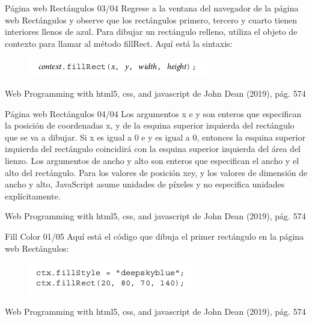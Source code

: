 \begin{frame}{Página web Rectángulos 03/04}
\justifying
Regrese a la ventana del navegador de la página web Rectángulos y observe que los rectángulos primero, tercero y cuarto tienen interiores llenos de azul. Para dibujar un rectángulo relleno, utiliza el objeto de contexto para llamar al método fillRect. Aquí está la sintaxis:

\begin{figure}[H]
\centering
\includegraphics[scale=0.4]{Section_Files/images/Sec01/05.png}
\end{figure}

{\tiny Web Programming with html5, css, and javascript de John Dean (2019), pág. 574}
\end{frame}

\begin{frame}{Página web Rectángulos 04/04}
\justifying
Los argumentos x e y son enteros que especifican la posición de coordenadas x, y de la esquina superior izquierda del rectángulo que se va a dibujar. Si x es igual a 0 e y es igual a 0, entonces la esquina superior izquierda del rectángulo coincidirá con la esquina superior izquierda del área del lienzo. Los argumentos de ancho y alto son enteros que especifican el ancho y el alto del rectángulo. Para los valores de posición xey, y los valores de dimensión de ancho y alto, JavaScript asume unidades de píxeles y no especifica unidades explícitamente.

{\tiny Web Programming with html5, css, and javascript de John Dean (2019), pág. 574}
\end{frame}

\begin{frame}{Fill Color 01/05}
\justifying
Aquí está el código que dibuja el primer rectángulo en la página web Rectángulos:

\begin{figure}[H]
\centering
\includegraphics[scale=0.4]{Section_Files/images/Sec02/10.png}
\end{figure}


{\tiny Web Programming with html5, css, and javascript de John Dean (2019), pág. 574}
\end{frame}

